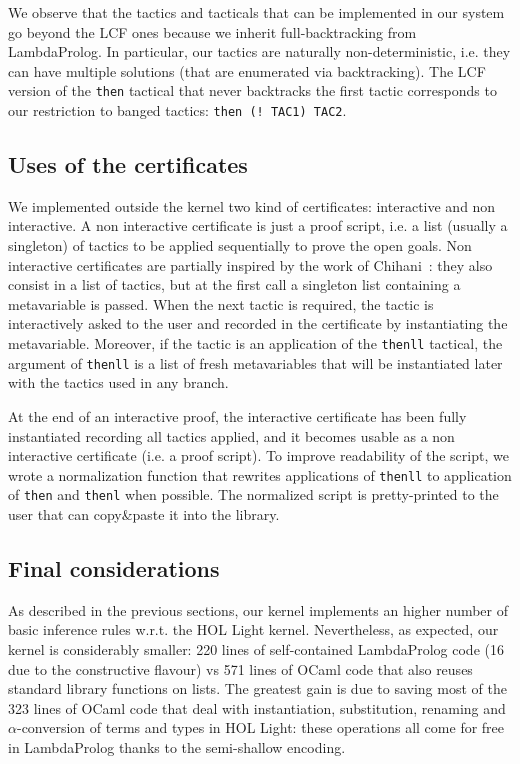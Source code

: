 \documentclass[preprint]{sigplanconf}
\begin{document}
We observe that the tactics and tacticals that can be implemented in our system go beyond the LCF ones because we inherit full-backtracking from LambdaProlog. In particular, our tactics are naturally non-deterministic, i.e. they can have multiple solutions (that are enumerated via backtracking).
The LCF version of the \verb+then+ tactical that never backtracks the first tactic corresponds to our restriction to banged tactics: \verb+then (! TAC1) TAC2+.

\subsection{Uses of the certificates}

We implemented outside the kernel two kind of certificates: interactive and non interactive. A non interactive certificate is just a proof script, i.e. a list (usually a singleton) of tactics to be applied sequentially to prove the open goals. Non interactive certificates are partially inspired by the work of Chihani~\cite{zak1}: they also consist in a list of tactics, but at the first call a singleton list containing a metavariable is passed. When the next tactic is required, the tactic is interactively asked to the user and recorded in the certificate by instantiating the metavariable. Moreover, if the tactic is an application of the \texttt{thenll} tactical, the argument of \texttt{thenll} is a list of fresh metavariables that will be instantiated later with the tactics used in any branch.

At the end of an interactive proof, the interactive certificate has been fully instantiated recording all tactics applied, and it becomes usable as a non interactive certificate (i.e. a proof script). To improve readability of the script, we wrote a normalization function that rewrites applications of \texttt{thenll} to application of \texttt{then} and \texttt{thenl} when possible. The normalized script is pretty-printed to the user that can copy\&paste it into the library.

\subsection{Final considerations}

As described in the previous sections, our kernel implements an higher number
of basic inference rules w.r.t. the HOL Light kernel. Nevertheless, as expected, our kernel is considerably smaller: 220 lines of self-contained LambdaProlog code (16 due to the constructive flavour) vs 571 lines of OCaml code that also reuses standard library functions on lists. The greatest gain is due to saving most of the 323 lines of OCaml code that deal with instantiation, substitution, renaming and $\alpha$-conversion of terms and types in HOL Light: these operations all come for free in LambdaProlog thanks to the semi-shallow encoding.
\end{document}
